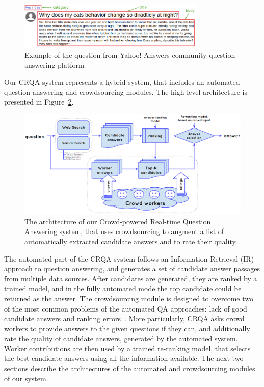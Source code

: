 \documentclass[letterpaper]{article}
\begin{document}
\begin{figure}[h!t]
	\centering
	\includegraphics[width=0.8\textwidth]{img/ya_question}
	\caption{Example of the question from Yahoo! Answers community question answering platform}
	\label{fig:ya_question}
\end{figure}

Our CRQA system represents a hybrid system, that includes an automated question answering and crowdsourcing modules.
The high level architecture is presented in Figure~\ref{fig:system}.

\begin{figure}[h!t]
	\centering
	\includegraphics[width=\textwidth]{img/system}
	\caption{The architecture of our Crowd-powered Real-time Question Answering system, that uses crowdsourcing to augment a list of automatically extracted candidate answers and to rate their quality}
	\label{fig:system}
\end{figure}

The automated part of the CRQA system follows an Information Retrieval (IR) approach to question answering, and generates a set of candidate answer passages from multiple data sources.
After candidates are generated, they are ranked by a trained model, and in the fully automated mode the top candidate could be returned as the answer.
The crowdsourcing module is designed to overcome two of the most common problems of the automated QA approaches: lack of good candidate answers and ranking errors~\cite{moldovan2003performance,savenkov_trecliveqa15}.
More particularly, CRQA asks crowd workers to provide answers to the given questions if they can, and additionally rate the quality of candidate answers, generated by the automated system.
Worker contributions are then used by a trained re-ranking model, that selects the best candidate answers using all the information available.
The next two sections describe the architectures of the automated and crowdsourcing modules of our system.
\end{document}
